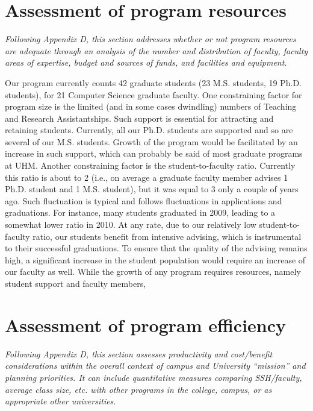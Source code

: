 \documentclass[12pt]{article}
\begin{document}
\section{Assessment of program resources}

{\em Following Appendix D, this section addresses whether or not program
  resources are adequate through an analysis of the number and distribution
  of faculty, faculty areas of expertise, budget and sources of funds, and
  facilities and equipment.}

Our program currently counts 42 graduate students (23 M.S. students,
19 Ph.D. students), for 21 Computer Science graduate faculty.  One
constraining factor for program size is the limited (and in some cases
dwindling) numbers of Teaching and Research Assistantships. Such
support is essential for attracting and retaining students.
Currently, all our Ph.D. students are supported and so are several of
our M.S. students. Growth of the program would be facilitated by an
increase in such support, which can probably be said of most graduate
programs at UHM.  Another constraining factor is the
student-to-faculty ratio. Currently this ratio is about to 2 (i.e., on
average a graduate faculty member advises 1 Ph.D. student and 1 M.S.
student), but it was equal to 3 only a couple of years ago. Such
fluctuation is typical and follows fluctuations in applications and
graduations. For instance, many students graduated in 2009, leading to
a somewhat lower ratio in 2010.  At any rate, due to our relatively
low student-to-faculty ratio, our students benefit from intensive
advising, which is instrumental to their successful graduations.  To
ensure that the quality of the advising remains high, a significant
increase in the student population would require an increase of our
faculty as well. While the growth of any program requires resources,
namely student support and faculty members,




\section{Assessment of program efficiency}

{\em Following Appendix D, this section assesses productivity and
  cost/benefit considerations within the overall context of campus and
  University ``mission'' and planning priorities.  It can include
  quantitative measures comparing SSH/faculty, average class size,
  etc. with other programs in the college, campus, or as appropriate other
  universities.}
\end{document}
